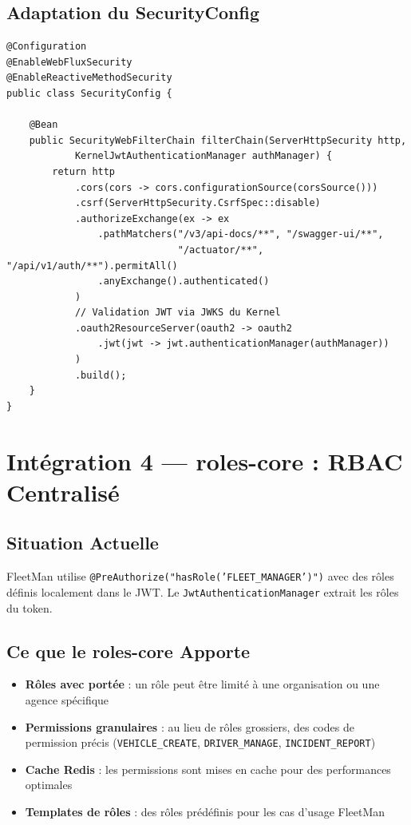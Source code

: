 \documentclass[12pt,a4paper]{report}
\begin{document}
\subsection{Adaptation du SecurityConfig}

\begin{lstlisting}[style=javaStyle, caption={Nouveau SecurityConfig avec JWT Kernel RS256}]
@Configuration
@EnableWebFluxSecurity
@EnableReactiveMethodSecurity
public class SecurityConfig {

    @Bean
    public SecurityWebFilterChain filterChain(ServerHttpSecurity http,
            KernelJwtAuthenticationManager authManager) {
        return http
            .cors(cors -> cors.configurationSource(corsSource()))
            .csrf(ServerHttpSecurity.CsrfSpec::disable)
            .authorizeExchange(ex -> ex
                .pathMatchers("/v3/api-docs/**", "/swagger-ui/**",
                              "/actuator/**", "/api/v1/auth/**").permitAll()
                .anyExchange().authenticated()
            )
            // Validation JWT via JWKS du Kernel
            .oauth2ResourceServer(oauth2 -> oauth2
                .jwt(jwt -> jwt.authenticationManager(authManager))
            )
            .build();
    }
}
\end{lstlisting}

\section{Intégration 4 — roles-core : RBAC Centralisé}

\subsection{Situation Actuelle}

FleetMan utilise \texttt{@PreAuthorize("hasRole('FLEET\_MANAGER')")} avec des rôles définis localement dans le JWT. Le \texttt{JwtAuthenticationManager} extrait les rôles du token.

\subsection{Ce que le roles-core Apporte}

\begin{itemize}[leftmargin=2cm]
  \item \textbf{Rôles avec portée} : un rôle peut être limité à une organisation ou une agence spécifique
  \item \textbf{Permissions granulaires} : au lieu de rôles grossiers, des codes de permission précis (\texttt{VEHICLE\_CREATE}, \texttt{DRIVER\_MANAGE}, \texttt{INCIDENT\_REPORT})
  \item \textbf{Cache Redis} : les permissions sont mises en cache pour des performances optimales
  \item \textbf{Templates de rôles} : des rôles prédéfinis pour les cas d'usage FleetMan
\end{itemize}
\end{document}
